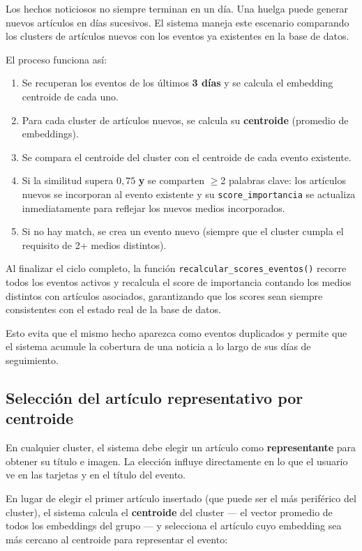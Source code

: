 \documentclass[12pt,a4paper]{article}
\begin{document}
Los hechos noticiosos no siempre terminan en un día. Una huelga puede generar nuevos artículos en días sucesivos. El sistema maneja este escenario comparando los clusters de artículos nuevos con los eventos ya existentes en la base de datos.

El proceso funciona así:

\begin{enumerate}[nosep]
  \item Se recuperan los eventos de los últimos \textbf{3 días} y se calcula el embedding centroide de cada uno.
  \item Para cada cluster de artículos nuevos, se calcula su \textbf{centroide} (promedio de embeddings).
  \item Se compara el centroide del cluster con el centroide de cada evento existente.
  \item Si la similitud supera $0{,}75$ \textbf{y} se comparten $\geq$2 palabras clave: los artículos nuevos se incorporan al evento existente y su \texttt{score\_importancia} se actualiza inmediatamente para reflejar los nuevos medios incorporados.
  \item Si no hay match, se crea un evento nuevo (siempre que el cluster cumpla el requisito de 2+ medios distintos).
\end{enumerate}

Al finalizar el ciclo completo, la función \texttt{recalcular\_scores\_eventos()} recorre todos los eventos activos y recalcula el score de importancia contando los medios distintos con artículos asociados, garantizando que los scores sean siempre consistentes con el estado real de la base de datos.

Esto evita que el mismo hecho aparezca como eventos duplicados y permite que el sistema acumule la cobertura de una noticia a lo largo de sus días de seguimiento.

\subsection{Selección del artículo representativo por centroide}

En cualquier cluster, el sistema debe elegir un artículo como \textbf{representante} para obtener su título e imagen. La elección influye directamente en lo que el usuario ve en las tarjetas y en el título del evento.

En lugar de elegir el primer artículo insertado (que puede ser el más periférico del cluster), el sistema calcula el \textbf{centroide} del cluster --- el vector promedio de todos los embeddings del grupo --- y selecciona el artículo cuyo embedding sea más cercano al centroide para representar el evento:
\end{document}
